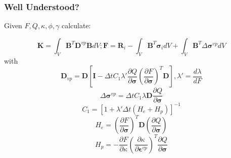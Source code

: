 \documentclass[usenames,dvipsnames,10pt]{beamer}
\makeatletter
\newcommand{\stack}[1]{\begin{tabular}{@{}c@{}}#1\end{tabular}}
\makeatother
\begin{document}
\begin{frame}
  
  \frametitle{Well Understood?}
  
  Given $F, Q, \kappa, \phi, \gamma$ calculate:

  \begin{equation} \label{EqImplicitFEM}
    \mathbf{K} = \int_V \mathbf{B}^T \mathbf{D}^{vp} \mathbf{B} dV; \mathbf{F} = \mathbf{R}_i - \int_V \mathbf{B}^T \bm{\sigma}_i dV + \int_V \mathbf{B}^T
    \Delta
    \bm{\sigma}^{vp} dV
    \end{equation}
    with
    \begin{equation}
    \mathbf{D}_{vp} =
    \mathbf{D} \left [
    \mathbf{I} - {\Delta t} C_1 \lambda' \frac{\partial Q}{\partial \bm{\sigma}} \left ( \frac{\partial F}{\partial
    \bm{\sigma}} \right )^{T} \mathbf{D}
    \right ], \lambda' = \frac{d \lambda}{d F}
    \end{equation}
    \begin{equation}
    \Delta \bm{\sigma}^{vp} = \Delta t C_1 \lambda \mathbf{D} \frac{\partial Q}{\partial \bm{\sigma}}
    \end{equation}
    \begin{equation}
    C_1 = [1 + \lambda' {\Delta t} (H_e + H_p)]^{-1}
    \end{equation}
    \begin{equation}
    \label{HEE}
    H_e = \left ( \frac{\partial F}{\partial \bm{\sigma}} \right )^T \mathbf{D} (\frac{\partial Q}{\partial \bm{\sigma}})
    \end{equation}
    \begin{equation}
    H_p = -\frac{\partial F}{\partial \kappa} \left ( \frac{\partial \kappa}{\partial \bm{\epsilon}^{vp}}
    \right )^T \frac{\partial Q}{\partial \bm{\sigma}}
    \end{equation}
  
\end{frame}
  
{
\addtolength\textwidth{-.4in} 
\setlength\hsize{\textwidth} 
\setlength\columnwidth{\textwidth}
\takahashi{\color{yellow}{\stack{Well\\Understood!}}}
}
  
\end{document}
